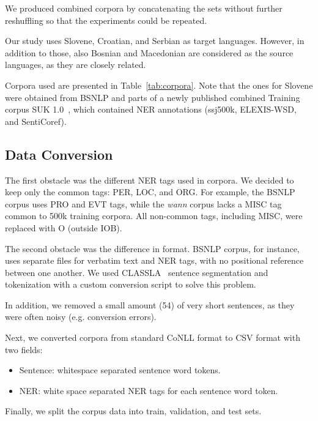 \documentclass[11pt]{article}
\begin{document}
We produced combined corpora by concatenating the sets without further reshuffling so that the experiments could be repeated.

Our study uses Slovene, Croatian, and Serbian as target languages. However, in addition to those, also Bosnian and Macedonian are considered as the source languages, as they are closely related.

Corpora used are presented in Table~\ref{tab:corpora}. 
Note that the ones for Slovene were obtained from BSNLP and parts of a newly published combined Training corpus {SUK} 1.0~\cite{SUK-1.0}, which contained NER annotations (ssj500k, ELEXIS-WSD, and SentiCoref). 


\subsection{Data Conversion}
\label{subsec:data-conversion}
The first obstacle was the different NER tags used in corpora.
We decided to keep only the common tags: PER, LOC, and ORG\@.
For example, the BSNLP corpus uses PRO and EVT tags, while the \textit{wann} corpus lacks a MISC tag common to 500k training corpora.
All non-common tags, including MISC, were replaced with O (outside IOB).

The second obstacle was the difference in format.
BSNLP corpus, for instance, uses separate files for verbatim text and NER tags, with no positional reference between one another. We used CLASSLA~\cite{ljubesic-dobrovoljc-2019-neural} sentence segmentation and tokenization with a custom conversion script to solve this problem. 

In addition, we removed a small amount (54) of very short sentences, as they were often noisy (e.g. conversion errors).

Next, we converted corpora from standard CoNLL format to CSV format with two fields:
\begin{itemize}
  \item Sentence: whitespace separated sentence word tokens.
  \item NER: white space separated NER tags for each sentence word token.
\end{itemize}

\begin{table}[H]
  \caption{Example whitespace separated sentence word tokens with corresponding IOB2 NER tags.}
  \label{tab:ner_example}
\end{table}
Finally, we split the corpus data into train, validation, and test sets.
\end{document}

